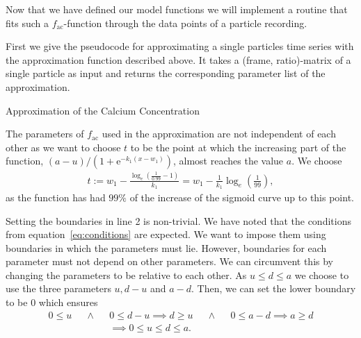 Now that we have defined our model functions we will implement a routine that fits such a $f_{\text{ac}}$-function through the data points of a particle recording.

First we give the pseudocode for approximating a single particles time series with the approximation function described above. It takes a (frame, ratio)-matrix of a single particle as input and returns the corresponding parameter list of the approximation.

\begin{algorithm}[H] \label{alg:approximate}
	\SetAlgoLined
	\DontPrintSemicolon
	\LinesNumbered
	\caption{Approximation of the Calcium Concentration}
	
	
	\BlankLine
\end{algorithm}

The parameters of $f_{\text{ac}}$ used in the approximation are not independent of each other as we want to choose $t$ to be the point at which the increasing part of the function, ${(a-u)/(1+\text{e}^{-k_1(x-w_1)})}$, almost reaches the value $a$. We choose
\begin{align*}
	t := w_1 - \frac{\log_e\left(\frac{1}{0.99}-1\right)}{k_1} = w_1 - \frac{1}{k_1} \log_e\left(\frac{1}{99}\right),
\end{align*}
as the function has had $99\%$ of the increase of the sigmoid curve up to this point.

Setting the boundaries in line 2 is non-trivial. We have noted that the conditions from equation~\ref{eq:conditions} are expected. We want to impose them using boundaries in which the parameters must lie. However, boundaries for each parameter must not depend on other parameters. We can circumvent this by changing the parameters to be relative to each other. As $u \leq d \leq a$ we choose to use the three parameters $u, d-u$ and $a-d$. Then, we can set the lower boundary to be $0$ which ensures
\begin{align*}
	0 \leq u &&\land &&0 \leq d - u \implies d \geq u &&\land &&0 \leq a - d \implies a \geq d\\
	&& &&\implies 0 \leq u \leq d \leq a.
\end{align*}

